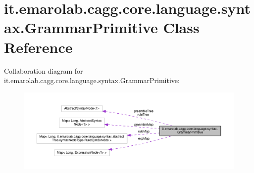 \hypertarget{classit_1_1emarolab_1_1cagg_1_1core_1_1language_1_1syntax_1_1GrammarPrimitive}{\section{it.\-emarolab.\-cagg.\-core.\-language.\-syntax.\-Grammar\-Primitive Class Reference}
\label{classit_1_1emarolab_1_1cagg_1_1core_1_1language_1_1syntax_1_1GrammarPrimitive}
}


Collaboration diagram for it.\-emarolab.\-cagg.\-core.\-language.\-syntax.\-Grammar\-Primitive\-:\nopagebreak
\begin{figure}[H]
\begin{center}
\leavevmode
\includegraphics[width=350pt]{classit_1_1emarolab_1_1cagg_1_1core_1_1language_1_1syntax_1_1GrammarPrimitive__coll__graph}
\end{center}
\end{figure}
